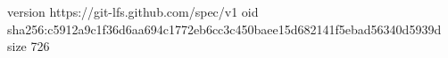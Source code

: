version https://git-lfs.github.com/spec/v1
oid sha256:c5912a9c1f36d6aa694c1772eb6cc3c450baee15d682141f5ebad56340d5939d
size 726
